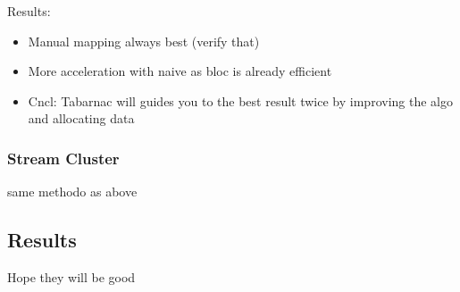 Results:
\begin{itemize}
    \item Manual mapping always best (verify that)
    \item More acceleration with naive as bloc is already efficient
    \item Cncl: Tabarnac will guides you to the best result twice by improving
        the algo and allocating data
\end{itemize}

\subsubsection{Stream Cluster}
same methodo as above
\subsection{Results}
\label{sec:expe-results}
Hope they will be good


